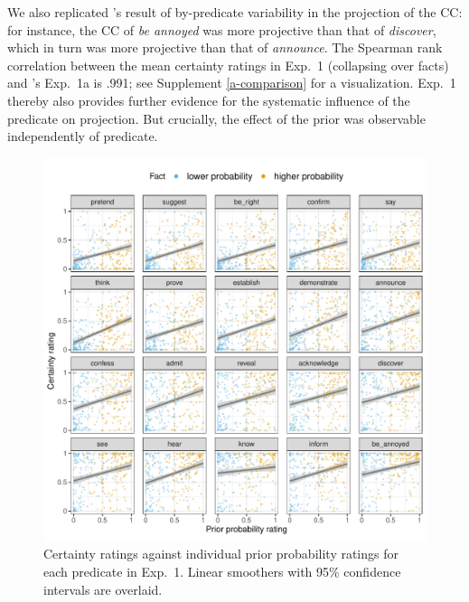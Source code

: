 \documentclass[11pt,fleqn]{article}
\newcommand{\6}{\mbox{$[\hspace*{-.6mm}[$}}
\newcommand{\9}{\mbox{$]\hspace*{-.6mm}]$}}
\newcommand{\citepos}[1]{\citeauthor{#1}'s \citeyear{#1}}
\begin{document}
We also replicated 's result of by-predicate variability in the projection of the CC: for instance, the CC of {\em be annoyed} was more projective than that of {\em discover}, which in turn was more projective than that of {\em announce}. The Spearman rank correlation between the mean certainty ratings in Exp.~1 (collapsing over facts) and \citepos{tonhauser-degen-factive} Exp.~1a is .991; see Supplement \ref{a-comparison} for a visualization. Exp.~1 thereby also provides further evidence for the systematic influence of the predicate on projection. But crucially, the effect of the prior was observable independently of predicate.

\begin{figure}[h!]
\centering

\includegraphics[width=.7\paperwidth]{../../results/9-prior-projection/graphs/projection-by-prior}

\caption{Certainty ratings against individual prior probability ratings for each predicate in Exp.~1. Linear smoothers with 95\% confidence intervals are overlaid.}
\label{f-projection}
\end{figure}
\end{document}
